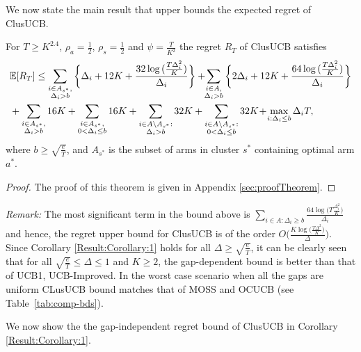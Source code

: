 	
We now state the main result that upper bounds the expected regret of ClusUCB.
\begin{theorem}
\label{Result:Theorem:1}
For $T\geq K^{2.4} $, $\rho_a =\frac{1}{2}$, $\rho_s =\frac{1}{2}$ and $\psi=\frac{T}{K^2}$ the regret $R_T$ of ClusUCB satisfies
\begin{align*}
&\mathbb{E} [R_{T}]\leq 
\sum\limits_{\substack{i\in A_{s^{*}},\\\Delta_{i} > b}}\bigg\lbrace \Delta_{i} + 12K
+ \frac{32\log{(\frac{T\Delta_i^2}{K})}}{\Delta_{i}} \bigg\rbrace
 + \! \! \sum\limits_{\substack{i\in A,\\\Delta_{i} > b}} \bigg\lbrace 2\Delta_{i} +
12K + \frac{64\log{(\frac{T\Delta_i^2}{K})}}{\Delta_{i}} \bigg\rbrace \\
&+ \sum\limits_{\substack{i\in A_{s^{*}},\\ \Delta_{i} > b}} 
16K+\sum\limits_{\substack{i\in A_{s^{*}},\\0 < \Delta_{i}\leq b}} 16K + \sum_{\substack{i\in A\setminus A_{s^*}:\\\Delta_{i}> b}}32K +\sum_{\substack{i\in A \setminus A_{s^*}:\\ 0 < \Delta_{i} \leq b}}32K 
 \!+\! \max\limits_{i:\Delta_{i}\leq b}\Delta_{i}T, 
\end{align*}
where $b\geq \sqrt{\frac{e}{T}}$, and $A_{s^{*}}$ is the subset of arms in cluster $s^{*}$ containing optimal arm $a^{*}$.
\end{theorem}
\begin{proof} The proof of this theorem is given in Appendix \ref{sec:proofTheorem}.
\end{proof}

\textit{Remark:} The most significant term in the bound above is $\sum_{i\in A:\Delta_{i}\geq b}\frac{64\log{\big(T\frac{\Delta_{i}^{2}}{K}\big)}}{\Delta_{i}}$ and hence, the regret upper bound for ClusUCB is of the order $O\bigg(\frac{K\log \big(\frac{T\Delta^{2}}{K}\big)}{\Delta}\bigg)$. Since Corollary \ref{Result:Corollary:1} holds for all $\Delta \geq \sqrt{\frac{e}{T}} $, it can be clearly seen that for all $\sqrt{\frac{e}{T}} \leq \Delta\leq 1$ and $K\geq 2$, the gap-dependent bound is better than that of UCB1, UCB-Improved. In the worst case scenario when all the gaps are uniform CLusUCB bound matches that of MOSS and OCUCB (see Table~\ref{tab:comp-bds}). 


We now show the the gap-independent regret bound of ClusUCB in Corollary \ref{Result:Corollary:1}.


